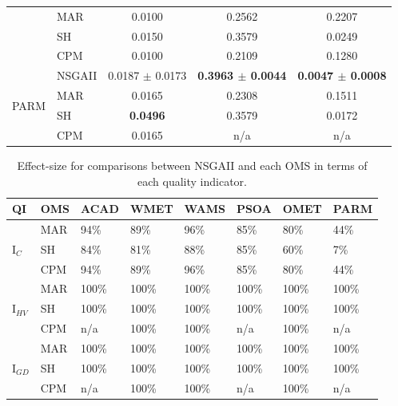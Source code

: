 \documentclass[conference]{IEEEtran}
\begin{document}
\begin{table}[htbp]
\begin{tabular}{p{0.7cm} p{0.7cm} ccc}
          & MAR   & 0.0100 & 0.2562 & 0.2207 \\
          & SH    & 0.0150 & 0.3579 & 0.0249 \\
          & CPM   & 0.0100 & 0.2109 & 0.1280 \\\hline
    \multirow{4}[2]{*}{PARM} & NSGAII & 0.0187 $\pm$ 0.0173 & \textbf{0.3963 $\pm$ 0.0044} & \textbf{0.0047 $\pm$ 0.0008} \\
          & MAR   & 0.0165 & 0.2308 & 0.1511 \\
          & SH    & \textbf{0.0496} & 0.3579 & 0.0172 \\
          & CPM   & 0.0165 & n/a   & n/a \\
    \bottomrule
    \end{tabular}%
\end{table}%

\begin{table}[htbp]
  \scriptsize
	\centering
  \caption{Effect-size for comparisons between NSGAII and each OMS in terms of each quality indicator.}
    \begin{tabular}{p{0.6cm} p{0.6cm} p{0.65cm} p{0.65cm}p{0.65cm}p{0.65cm}p{0.65cm}p{0.65cm}}
    \toprule
    \textbf{QI} & \textbf{OMS} & \textbf{ACAD} & \textbf{WMET} & \textbf{WAMS} & \textbf{PSOA} & \textbf{OMET} & \textbf{PARM} \\
    \midrule
    \multirow{3}[1]{*}{I$_{C}$} 
		      & MAR   & 94\%  & 89\%  & 96\%  & 85\%  & 80\%  & 44\% \\
          & SH    & 84\%  & 81\%  & 88\%  & 85\%  & 60\%  &  7\% \\
          & CPM   & 94\%  & 89\%  & 96\%  & 85\%  & 80\%  & 44\% \\\hline
    \multirow{3}[2]{*}{I$_{HV}$} 
		      & MAR   & 100\% & 100\% & 100\% & 100\% & 100\% & 100\% \\
          & SH    & 100\% & 100\% & 100\% & 100\% & 100\% & 100\% \\
          & CPM   &   n/a & 100\% & 100\% &   n/a & 100\% &   n/a \\\hline
    \multirow{3}[2]{*}{I$_{GD}$} 
		      & MAR   & 100\% & 100\% & 100\% & 100\% & 100\% & 100\% \\
          & SH    & 100\% & 100\% & 100\% & 100\% & 100\% & 100\% \\
          & CPM   &   n/a & 100\% & 100\% &   n/a & 100\% &   n/a \\
    \bottomrule
    \end{tabular}%
\end{table}%
\end{document}
